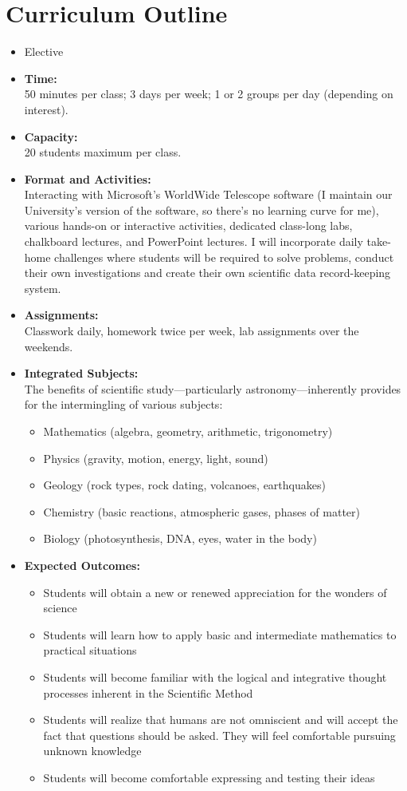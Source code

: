 \section*{Curriculum Outline}
\begin{itemize}
\item Elective
\item \textbf{Time:} \\50 minutes per class; 3 days per week; 1 or 2 groups per day (depending on interest).
\item \textbf{Capacity:} \\20 students maximum per class.
\item \textbf{Format and Activities:} \\ Interacting with Microsoft's WorldWide Telescope software (I maintain our University's version of the software, so there's no learning curve for me), various hands-on or interactive activities, dedicated class-long labs, chalkboard lectures, and PowerPoint lectures. I will incorporate daily take-home challenges where students will be required to solve problems, conduct their own investigations and create their own scientific data record-keeping system. 
\item \textbf{Assignments:} \\Classwork daily, homework twice per week, lab assignments over the weekends.
\item \textbf{Integrated Subjects:} \\
	The benefits of scientific study---particularly astronomy---inherently provides for the intermingling of various subjects:
	\begin{itemize}
	\item Mathematics (algebra, geometry, arithmetic, trigonometry)
	\item Physics (gravity, motion, energy, light, sound)
	\item Geology (rock types, rock dating, volcanoes, earthquakes)
	\item Chemistry (basic reactions, atmospheric gases, phases of matter)
	\item Biology (photosynthesis, DNA, eyes, water in the body)
	\end{itemize}
	
\item \textbf{Expected Outcomes:}
	\begin{itemize}
	\item Students will obtain a new or renewed appreciation for the wonders of science
	\item Students will learn how to apply basic and intermediate mathematics to practical situations
	\item Students will become familiar with the logical and integrative thought processes inherent in the Scientific Method
	\item Students will realize that humans are not omniscient and will accept the fact that questions should be asked. They will feel comfortable pursuing unknown knowledge
	\item Students will become comfortable expressing and testing their ideas
	\end{itemize}


\end{itemize}
